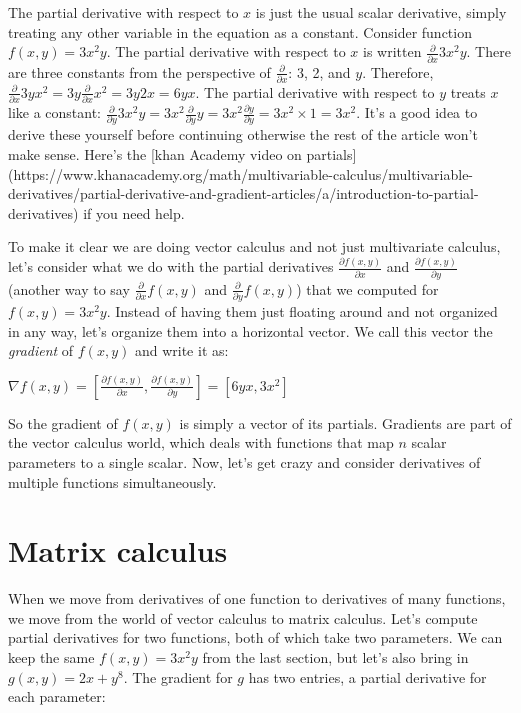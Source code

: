 \documentclass[11pt]{article}
\begin{document}
The partial derivative with respect to $x$ is just the usual scalar derivative, simply treating any other variable in the equation as a constant.  Consider function $f(x,y) = 3x^2y$. The partial derivative with respect to $x$ is written $\frac{\partial}{\partial x} 3x^2y$. There are three constants from the perspective of $\frac{\partial}{\partial x}$: 3, 2, and $y$. Therefore, $\frac{\partial}{\partial x} 3yx^2 = 3y\frac{\partial}{\partial x} x^2 = 3y2x = 6yx$. The partial derivative with respect to $y$ treats $x$ like a constant: $\frac{\partial}{\partial y} 3x^2y = 3x^2\frac{\partial}{\partial y} y = 3x^2\frac{\partial y}{\partial y} = 3x^2 \times 1 = 3x^2$.  It's a good idea to derive these yourself before continuing otherwise the rest of the article won't make sense.  Here's the [khan Academy video on partials](https://www.khanacademy.org/math/multivariable-calculus/multivariable-derivatives/partial-derivative-and-gradient-articles/a/introduction-to-partial-derivatives) if you need help.

To make it clear we are doing vector calculus and not just multivariate calculus, let's consider what we do with the partial derivatives $\frac{\partial f(x,y)}{\partial x}$ and $\frac{\partial f(x,y)}{\partial y}$ (another way to say $\frac{\partial}{\partial x}f(x,y)$ and $\frac{\partial }{\partial y}f(x,y)$) that we computed for $f(x,y) = 3x^2y$.  Instead of having them just floating around and not organized in any way, let's organize them into a horizontal vector. We call this vector the {\em gradient} of $f(x,y)$ and write it as:

$\nabla f(x,y)  = [ \frac{\partial f(x,y)}{\partial x}, \frac{\partial f(x,y)}{\partial y}] = [6yx, 3x^2]$

So the gradient of $f(x,y)$ is simply a vector of its partials. Gradients are part of the vector calculus world, which deals with functions that map $n$ scalar parameters to a single scalar.  Now, let's get crazy and consider derivatives of multiple functions simultaneously.

\section{Matrix calculus}

When we move from derivatives of one function to derivatives of many functions, we move from the world of vector calculus to matrix calculus. Let's compute partial derivatives for two functions, both of which take two parameters.  We can keep the same $f(x,y) = 3x^2y$ from the last section, but let's also bring in $g(x,y) = 2x + y^8$.  The gradient for $g$ has two entries, a partial derivative for each parameter:
\end{document}
